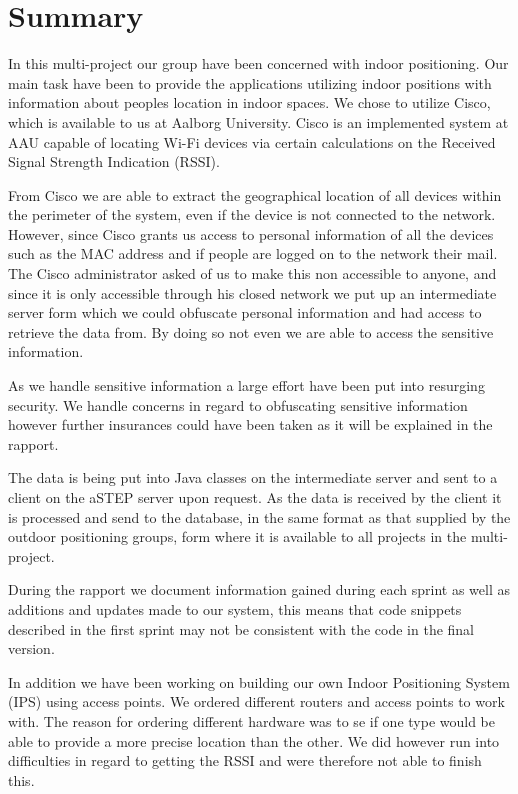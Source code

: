 \chapter*{Summary}
In this multi-project our group have been concerned with indoor positioning. Our main task have been to provide the applications utilizing indoor positions with information about peoples location in indoor spaces. We chose to utilize Cisco, which is available to us at Aalborg University. Cisco is an implemented system at AAU capable of locating Wi-Fi devices via certain calculations on the Received Signal Strength Indication (RSSI).

From Cisco we are able to extract the geographical location of all devices within the perimeter of the system, even if the device is not connected to the network. However, since Cisco grants us access to personal information of all the devices such as the MAC address and if people are logged on to the network their mail. The Cisco administrator asked of us to make this non accessible to anyone, and since it is only accessible through his closed network we put up an intermediate server form which we could obfuscate personal information and had access to retrieve the data from. By doing so not even we are able to access the sensitive information. 

As we handle sensitive information a large effort have been put into resurging security. We handle concerns in regard to obfuscating sensitive information however further insurances could have been taken as it will be explained in the rapport.

The data is being put into Java classes on the intermediate server and sent to a client on the aSTEP server upon request. As the data is received by the client it is processed and send to the database, in the same format as that supplied by the outdoor positioning groups, form where it is available to all projects in the multi-project.

During the rapport we document information gained during each sprint as well as additions and updates made to our system, this means that code snippets described in the first sprint may not be consistent with the code in the final version.

In addition we have been working on building our own Indoor Positioning System (IPS) using access points. We ordered different routers and access points to work with. The reason for ordering different hardware was to se if one type would be able to provide a more precise location than the other. We did however run into difficulties in regard to getting the RSSI and were therefore not able to finish this.

